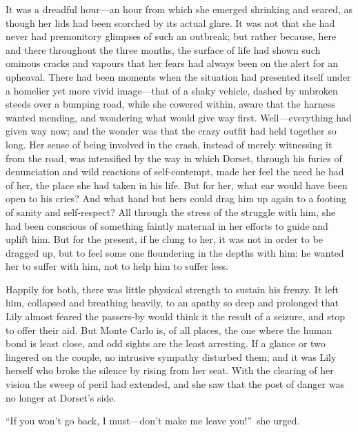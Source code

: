 \documentclass[12pt,a4paper]{book}
\begin{document}
It was a dreadful hour---an hour from which she emerged shrinking
and seared, as though her lids had been scorched by its actual
glare. It was not that she had never had premonitory glimpses of
such an outbreak; but rather because, here and there
throughout the three months, the surface of life had shown such
ominous cracks and vapours that her fears had always been on the
alert for an upheaval. There had been moments when the situation
had presented itself under a homelier yet more vivid image---that
of a shaky vehicle, dashed by unbroken steeds over a bumping
road, while she cowered within, aware that the harness wanted
mending, and wondering what would give way first. 
Well---everything had given way now; and the wonder was that the
crazy outfit had held together so long. Her sense of being
involved in the crash, instead of merely witnessing it from the
road, was intensified by the way in which Dorset, through his
furies of denunciation and wild reactions of self-contempt, made
her feel the need he had of her, the place she had taken in his
life. But for her, what ear would have been open to his cries? 
And what hand but hers could drag him up again to a footing of
sanity and self-respect? All through the stress of the struggle
with him, she had been conscious of something faintly maternal in
her efforts to guide and uplift him. But for the present, if he
clung to her, it was not in order to be dragged up, but to feel
some one floundering in the depths with him: he wanted her to
suffer with him, not to help him to suffer less.





Happily for both, there was little physical strength to sustain
his frenzy. It left him, collapsed and breathing heavily, to an
apathy so deep and prolonged that Lily almost feared the
passers-by would think it the result of a seizure, and stop to
offer their aid. But Monte Carlo is, of all places, the one where
the human bond is least close, and odd sights are the least
arresting. If a glance or two lingered on the couple, no
intrusive sympathy disturbed them; and it was Lily herself who
broke the silence by rising from her seat. With the clearing of
her vision the sweep of peril had extended, and she saw that the
post of danger was no longer at Dorset's side.





``If you won't go back, I must---don't make me leave you!''\ she
urged.
\end{document}
